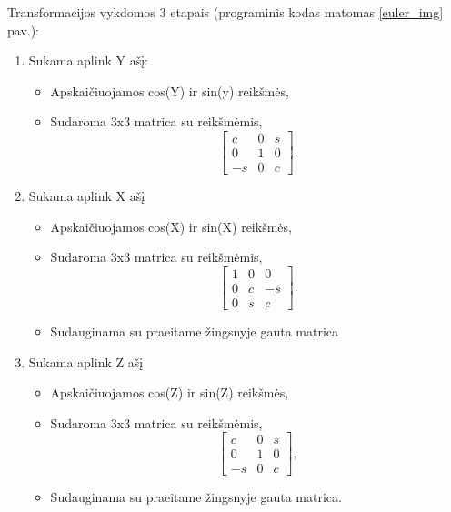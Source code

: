 \documentclass{VUMIFInfBakalaurinis}
\begin{document}
Transformacijos vykdomos 3 etapais (programinis kodas matomas \ref{euler_img} pav.):
\begin{enumerate}[itemsep=0.5pt]
  \item Sukama aplink Y ašį:
  \begin{itemize}[itemsep=0.5pt]
    \item Apskaičiuojamos cos(Y) ir sin(y) reikšmės,
    \item Sudaroma 3x3 matrica su reikšmėmis,
    \begin{equation*}
      \begin{bmatrix}
        c & 0 & s \\
        0 & 1 & 0 \\
        -s & 0 & c
      \end{bmatrix}
      .
    \end{equation*}
  \end{itemize}
  \item Sukama aplink X ašį
  \begin{itemize}[itemsep=0.5pt]
    \item Apskaičiuojamos cos(X) ir sin(X) reikšmės,
    \item Sudaroma 3x3 matrica su reikšmėmis,
    \begin{equation*}
      \begin{bmatrix}
        1 & 0 & 0 \\
        0 & c & -s \\
        0 & s & c
      \end{bmatrix}
      .
    \end{equation*}
    \item Sudauginama su praeitame žingsnyje gauta matrica
  \end{itemize}
  \item Sukama aplink Z ašį
  \begin{itemize}[itemsep=0.5pt]
    \item Apskaičiuojamos cos(Z) ir sin(Z) reikšmės,
    \item Sudaroma 3x3 matrica su reikšmėmis, 
    \begin{equation*}
      \begin{bmatrix}
        c & 0 & s \\
        0 & 1 & 0 \\
        -s & 0 & c
      \end{bmatrix}
      ,
    \end{equation*}
    \item Sudauginama su praeitame žingsnyje gauta matrica.
  \end{itemize}
\end{enumerate}
\end{document}
